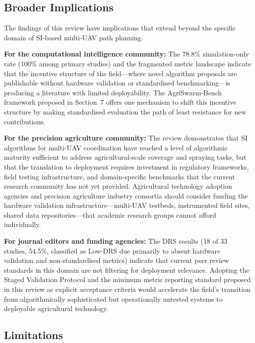 \documentclass[review,3p,times]{elsarticle}
\begin{document}
\subsection{Broader Implications}

The findings of this review have implications that extend beyond the specific domain of SI-based multi-UAV path planning.

\textbf{For the computational intelligence community:} The 78.8\% simulation-only rate (100\% among primary studies) and the fragmented metric landscape indicate that the incentive structure of the field---where novel algorithm proposals are publishable without hardware validation or standardised benchmarking---is producing a literature with limited deployability. The AgriSwarm-Bench framework proposed in Section~7 offers one mechanism to shift this incentive structure by making standardised evaluation the path of least resistance for new contributions.

\textbf{For the precision agriculture community:} The review demonstrates that SI algorithms for multi-UAV coordination have reached a level of algorithmic maturity sufficient to address agricultural-scale coverage and spraying tasks, but that the translation to deployment requires investment in regulatory frameworks, field testing infrastructure, and domain-specific benchmarks that the current research community has not yet provided. Agricultural technology adoption agencies and precision agriculture industry consortia should consider funding the hardware validation infrastructure---multi-UAV testbeds, instrumented field sites, shared data repositories---that academic research groups cannot afford individually.

\textbf{For journal editors and funding agencies:} The DRS results (18 of 33 studies, 54.5\%, classified as Low-DRS due primarily to absent hardware validation and non-standardised metrics) indicate that current peer review standards in this domain are not filtering for deployment relevance. Adopting the Staged Validation Protocol and the minimum metric reporting standard proposed in this review as explicit acceptance criteria would accelerate the field's transition from algorithmically sophisticated but operationally untested systems to deployable agricultural technology.

\subsection{Limitations}
\label{sec:limitations}
\end{document}
